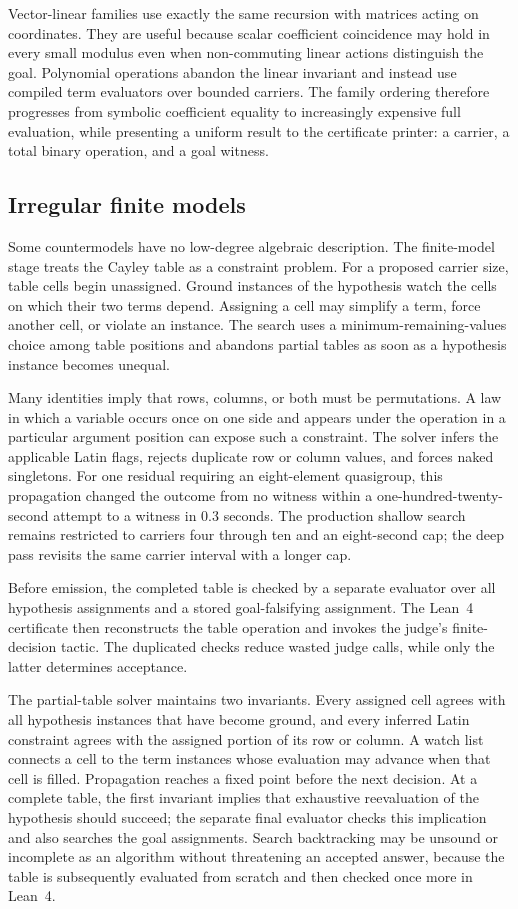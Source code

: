\documentclass[10pt,twocolumn]{article}
\newcommand{\lean}{Lean~4\xspace}
\begin{document}
Vector-linear families use exactly the same recursion with matrices acting on
coordinates.  They are useful because scalar coefficient coincidence may
hold in every small modulus even when non-commuting linear actions distinguish
the goal.  Polynomial operations abandon the linear invariant and instead use
compiled term evaluators over bounded carriers.  The family ordering therefore
progresses from symbolic coefficient equality to increasingly expensive full
evaluation, while presenting a uniform result to the certificate printer: a
carrier, a total binary operation, and a goal witness.

\subsection{Irregular finite models}

Some countermodels have no low-degree algebraic description.  The finite-model
stage treats the Cayley table as a constraint problem.  For a proposed carrier
size, table cells begin unassigned.  Ground instances of the hypothesis watch
the cells on which their two terms depend.  Assigning a cell may simplify a
term, force another cell, or violate an instance.  The search uses a
minimum-remaining-values choice among table positions and abandons partial
tables as soon as a hypothesis instance becomes unequal.

Many identities imply that rows, columns, or both must be permutations.  A law in
which a variable occurs once on one side and appears under the operation in a
particular argument position can expose such a constraint.  The solver infers
the applicable Latin flags, rejects duplicate row or column values, and forces
naked singletons.  For one residual requiring an eight-element quasigroup,
this propagation changed the outcome from no witness within a
one-hundred-twenty-second attempt to a witness in 0.3 seconds.  The production
shallow search remains restricted to carriers four through ten and an eight-second cap; the deep pass revisits the
same carrier interval with a longer cap.

Before emission, the completed table is checked by a separate evaluator over
all hypothesis assignments and a stored goal-falsifying assignment.  The
\lean certificate then reconstructs the table operation and invokes the
judge's finite-decision tactic.  The duplicated checks reduce wasted judge
calls, while only the latter determines acceptance.

The partial-table solver maintains two invariants.  Every assigned cell agrees
with all hypothesis instances that have become ground, and every inferred
Latin constraint agrees with the assigned portion of its row or column.  A
watch list connects a cell to the term instances whose evaluation may advance
when that cell is filled.  Propagation reaches a fixed point before the next
decision.  At a complete table, the first invariant implies that exhaustive
reevaluation of the hypothesis should succeed; the separate final evaluator
checks this implication and also searches the goal assignments.  Search
backtracking may be unsound or incomplete as an algorithm without threatening
an accepted answer, because the table is subsequently evaluated from scratch
and then checked once more in \lean.
\end{document}
